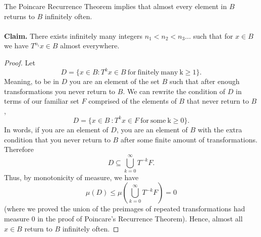 \documentclass{article}
\begin{document}
The Poincare Recurrence Theorem implies that almost every element in $B$ returns to $B$ infinitely often. \\ \\
\textbf{Claim.} There exists infinitely many integers $n_1 < n_2 < n_3 ...$ such that for $x \in B$ we have
$T^{n_i}x \in B$ almost everywhere. 
\begin{proof}
Let $$D = \{x \in B : T^{k}x \in B\ \mathrm{for\ finitely\ many\ k \geq 1\}}.$$ 
Meaning, to be in $D$ you are an element of the set $B$ such that after enough transformations you never return to $B$. 
We can rewrite the condition of $D$ in terms of our familiar set $F$ comprised of the elements of $B$ that never return to $B$, 
$$D = \{x \in B\ : T^{k}x \in F\ \mathrm{for\ some\ k \geq 0\}}.$$
In words, if you are an element of $D$, you are an element of $B$ with the extra condition that you never return to $B$ after some finite amount
of transformations. Therefore $$D \subseteq \bigcup\limits_{k=0}^{\infty} T^{-k}F.$$ Thus, by monotonicity of measure, we have
$$ \mu(D) \leq \mu(\bigcup\limits_{k=0}^{\infty} T^{-k}F) = 0$$ (where we proved the union of the preimages of repeated transformations had measure 0 
in the proof of Poincare's Recurrence Theorem).
Hence, almost all $x \in B$ return to 
$B$ infinitely often. 

\end{proof}
\end{document}
